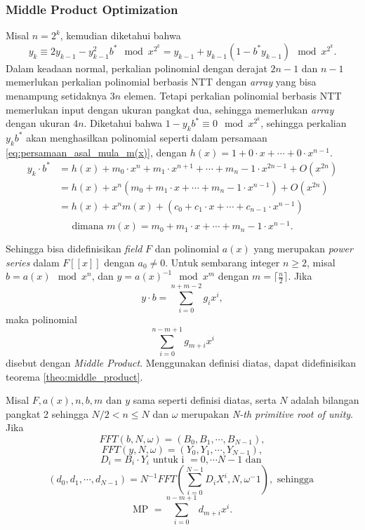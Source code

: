 \subsubsection{ Middle Product Optimization}
\indent Misal $ n = 2^k $, kemudian diketahui bahwa
$$ y_k \equiv 2y_{k-1} - y_{k-1}^2 b^* \mod{x^{2^{k}}} = y_{k-1} + y_{k-1}(1 - b^* y_{k-1}) \mod{x^{2^k}}. $$
Dalam keadaan normal, perkalian polinomial dengan derajat $ 2n - 1 $ dan $ n - 1 $ memerlukan perkalian polinomial berbasis NTT dengan \textit{array} yang bisa menampung setidaknya $ 3n $ elemen. Tetapi perkalian polinomial berbasis NTT memerlukan input dengan ukuran pangkat dua, sehingga memerlukan \textit{array} dengan ukuran $ 4n $. Diketahui bahwa $ 1-y_kb^* \equiv 0 \mod{x^{2^k}} $, sehingga perkalian $ y_kb^* $ akan menghasilkan polinomial seperti dalam persamaan \eqref{eq:persamaan_asal_mula_m(x)}, dengan $ h(x) = 1 + 0 \cdot x + \cdots + 0 \cdot x^{n-1}. $
\begin{equation}
	\begin{aligned}
y_k \cdot b^* &= h(x) + m_0 \cdot x^n + m_1 \cdot x^{n+1} + \cdots + m_n-1 \cdot x^{2n-1} + O(x^{2n}) \\
			  &= h(x) + x^n ( m_0 + m_1 \cdot x + \cdots + m_n-1 \cdot x^{n-1}) + O(x^{2n}) \\
			  &= h(x) + x^n m(x) + (c_0 + c_1 \cdot x + \cdots + c_{n-1} \cdot x^{n-1} ) \\
	\end{aligned}
	\label{eq:persamaan_asal_mula_m(x)}
\end{equation}
$$ \text{dimana } m(x) = m_0 + m_1 \cdot x + \cdots + m_n-1 \cdot x^{n-1}. $$

Sehingga bisa didefinisikan \textit{field} $ F $ dan polinomial $ a(x) $ yang merupakan \textit{power series} dalam $ F[[x]] $ dengan $ a_0 \neq 0 $. Untuk sembarang integer $ n \geq 2 $, misal $ b = a(x) \mod{x^n} $, dan $ y = a(x)^{-1} \mod{x^m} $ dengan $ m = \lceil \frac{n}{2} \rceil $. Jika 
$$ y \cdot b = \sum_{i=0}^{n+m-2}g_ix^i, $$ maka polinomial $$ \sum_{i=0}^{n-m+1} g_{m+i} x^i $$ disebut dengan \textit{Middle Product}.
Menggunakan definisi diatas, dapat didefinisikan teorema \ref{theo:middle_product}\cite{middle_product_op}.

\begin{theo}
	\label{theo:middle_product}
	Misal $ F,a(x),n,b,m \text{ dan } y $ sama seperti definisi diatas, serta $ N $ adalah bilangan pangkat 2 sehingga $ N/2 < n \leq N $ dan $ \omega $ merupakan \textit{N-th primitive root of unity}. Jika
		$$ FFT(b,N,\omega) = (B_0, B_1, \cdots, B_{N-1}), $$
		$$ FFT(y,N,\omega) = (Y_0, Y_1, \cdots, Y_{N-1}), $$
		$$ D_i = B_i \cdot Y_i \text{ untuk i } = 0, \cdots N-1 \text{ dan } $$
		$$ (d_0, d_1, \cdots , d_{N-1}) = N^{-1} FFT(\sum_{i=0}^{N-1} D_iX^i, N, \omega^-1), \text{ sehingga } $$
		$$ \text{MP } = \sum_{i=0}^{n-m+1} d_{m+i}x^i. $$
		\label{eq:middle_product}
\end{theo}

